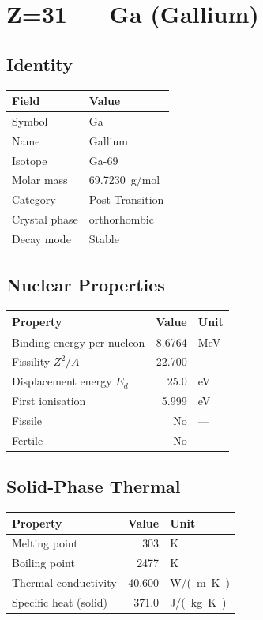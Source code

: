 \documentclass[11pt,a4paper]{article}
\begin{document}
\newpage

\section{Z=31 --- Ga (Gallium)}
\label{sec:Z31}

\subsection{Identity}
\begin{tabular}{ll}
  \toprule
  Field & Value \\
  \midrule
  Symbol & Ga \\
  Name & Gallium \\
  Isotope & Ga-69 \\
  Molar mass & \SI{69.7230}{g/mol} \\
  Category & Post-Transition \\
  Crystal phase & orthorhombic \\
  Decay mode & Stable \\
  \bottomrule
\end{tabular}

\subsection{Nuclear Properties}
\begin{tabular}{lrl}
  \toprule
  Property & Value & Unit \\
  \midrule
  Binding energy per nucleon & 8.6764 & \si{MeV} \\
  Fissility $Z^2/A$ & 22.700 & --- \\
  Displacement energy $E_d$ & 25.0 & \si{eV} \\
  First ionisation & 5.999 & \si{eV} \\
  Fissile & No & --- \\
  Fertile & No & --- \\
  \bottomrule
\end{tabular}

\subsection{Solid-Phase Thermal}
\begin{tabular}{lrl}
  \toprule
  Property & Value & Unit \\
  \midrule
  Melting point & 303 & \si{K} \\
  Boiling point & 2477 & \si{K} \\
  Thermal conductivity & 40.600 & \si{W/(m.K)} \\
  Specific heat (solid) & 371.0 & \si{J/(kg.K)} \\
  \bottomrule
\end{tabular}
\end{document}
